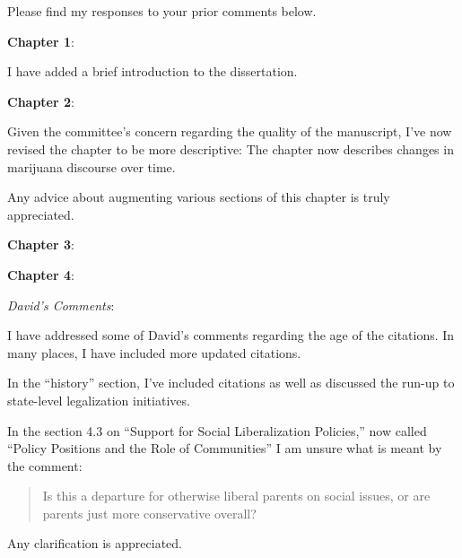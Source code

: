 \documentclass[12pt,stdletter,dateno,sigleft]{newlfm} %
\begin{document}
\begin{newlfm}


Please find my responses to your prior comments below. \newline%


\textbf{Chapter 1}:

I have added a brief introduction to the dissertation. \newline 


\textbf{Chapter 2}: 

Given the committee's concern regarding the quality of the manuscript, I've now revised the chapter to be more descriptive: The chapter now describes changes in marijuana discourse over time. 

Any advice about augmenting various sections of this chapter is truly appreciated. \newline




\textbf{Chapter 3}: \newline


\textbf{Chapter 4}: 

\textit{David's Comments}:

I have addressed some of David's comments regarding the age of the citations. In many places, I have included more updated citations. 

In the ``history'' section, I've included citations as well as discussed the run-up to state-level legalization initiatives. 

In the section 4.3 on ``Support for Social Liberalization Policies,'' now called ``Policy Positions and the Role of Communities'' I am unsure what is meant by the comment:
\begin{quote}
Is this a departure for otherwise liberal parents on social issues, or are parents just more conservative overall?
\end{quote}
Any clarification is appreciated.


\end{newlfm}
\end{document}

